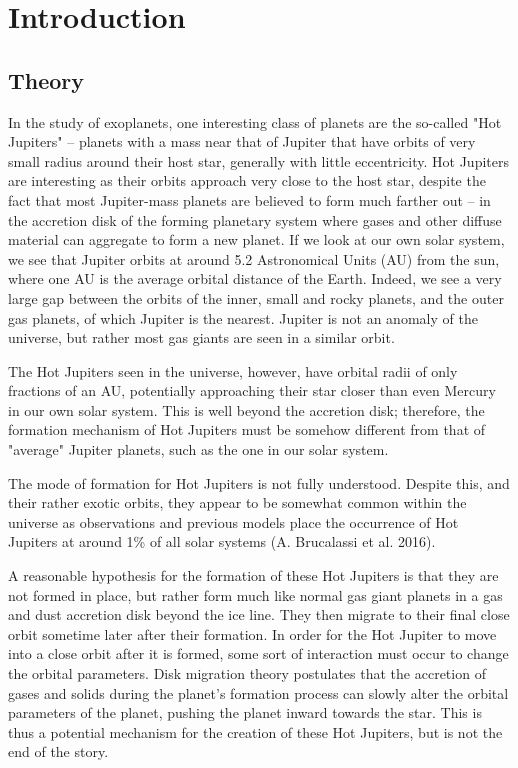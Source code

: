 \documentclass[12pt]{article}
\begin{document}
\clearpage

\section{Introduction}

\subsection{Theory}

In the study of exoplanets, one interesting class of planets are the so-called "Hot Jupiters" -- planets with a mass near that of Jupiter 
that have orbits of very small radius around their host star, generally with little eccentricity.
Hot Jupiters are interesting as their orbits approach very close to the host star,
despite the fact that most Jupiter-mass planets are believed to form much farther
out -- in the accretion disk of the forming planetary system where gases 
and other diffuse material can aggregate to form a new planet. If we look at our own
solar system, we see that Jupiter orbits at around 5.2 Astronomical Units (AU) from the
sun, where one AU is the average orbital distance of the Earth. Indeed,
we see a very large gap between the orbits of the inner, small and rocky planets, and
the outer gas planets, of which Jupiter is the nearest. Jupiter is not an anomaly of
the universe, but rather most gas giants are seen in a similar orbit. %

The Hot Jupiters seen in the universe, however, have orbital 
radii of only fractions of an AU, potentially 
approaching their star closer than even Mercury in our own solar system. %
This is well beyond the accretion disk; therefore, the formation mechanism of Hot Jupiters
must be somehow different from that of "average" Jupiter planets, such as the one in our
solar system.

The mode of formation for Hot Jupiters is not fully understood.
Despite this, and their rather exotic orbits, 
they appear to be somewhat common within the universe as observations and previous models place the occurrence of Hot Jupiters at around 1\% of all solar systems (A. Brucalassi et al. 2016).  

A reasonable hypothesis for the formation of these Hot Jupiters is that they are not formed in place, but rather form much like normal gas giant planets 
in a gas and dust accretion disk beyond the ice line. They then migrate to their final close orbit sometime later after their formation. 
In order for the Hot Jupiter to move into a close orbit after it is formed, some sort of interaction must occur to change the orbital parameters. 
Disk migration theory postulates that the accretion of gases and 
solids during the planet's formation process can slowly alter the orbital 
parameters of the planet,
pushing the planet inward towards the star.
This is thus a potential mechanism for the creation of these Hot Jupiters, but is not the end of the story.
\end{document}
